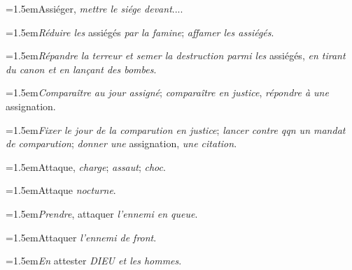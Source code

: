 \par{\dictfontsize\hangindent=1.5em\noindent Assiéger, \textit{mettre le siége devant}.... \par}
\par{\dictfontsize\hangindent=1.5em\noindent \textit{Réduire les} assiégés \textit{par la famine}; \textit{affamer les assiégés}. \par}
\par{\dictfontsize\hangindent=1.5em\noindent \textit{Répandre la terreur et semer la destruction parmi les} assiégés, \textit{en tirant du canon et en lançant des bombes}. \par}
\par{\dictfontsize\hangindent=1.5em\noindent \textit{Comparaître au jour assigné}; \textit{comparaître en justice}, \textit{répondre à une} assignation. \par}
\par{\dictfontsize\hangindent=1.5em\noindent \textit{Fixer le jour de la comparution en justice}; \textit{lancer contre qqn un mandat de comparution}; \textit{donner une} assignation, \textit{une citation}. \par}
\par{\dictfontsize\hangindent=1.5em\noindent Attaque, \textit{charge}; \textit{assaut}; \textit{choc}. \par}
\par{\dictfontsize\hangindent=1.5em\noindent Attaque \textit{nocturne}. \par}
\par{\dictfontsize\hangindent=1.5em\noindent \textit{Prendre}, attaquer \textit{l’ennemi en queue}. \par}
\par{\dictfontsize\hangindent=1.5em\noindent Attaquer \textit{l’ennemi de front}. \par}
\par{\dictfontsize\hangindent=1.5em\noindent \textit{En} attester \textit{DIEU et les hommes}. \par}
